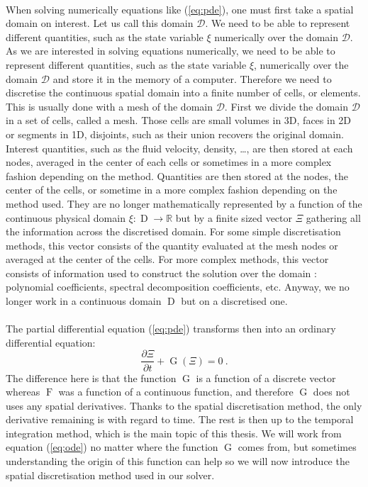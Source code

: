     \paragraph{}
    When solving numerically equations like (\ref{eq:pde}), one must first take a spatial domain on interest.
    Let us call this domain $\mathcal{D}$.
    We need to be able to represent different quantities, such as the state variable $\xi$ numerically over the domain $\mathcal{D}$.
    As we are interested in solving equations numerically, we need to be able to represent different quantities, such as the state variable $\xi$, numerically over the domain $\mathcal{D}$ and store it in the memory of a computer.
    Therefore we need to discretise the continuous spatial domain into a finite number of cells, or elements.
    This is usually done with a mesh of the domain $\mathcal{D}$.
    First we divide the domain $\mathcal{D}$ in a set of cells, called a mesh.
    Those cells are small volumes in 3D, faces in 2D or segments in 1D, disjoints, such as their union recovers the original domain.
    Interest quantities, such as the fluid velocity, density, \dots, are then stored at each nodes, averaged in the center of each cells or sometimes in a more complex fashion depending on the method.
    Quantities are then stored at the nodes, the center of the cells, or sometime in a more complex fashion depending on the method used.
    They are no longer mathematically represented by a function of the continuous physical domain $\xi : \operatorname{D} \rightarrow \mathbb{R}$ but by a finite sized vector $\Xi$ gathering all the information across the discretised domain.
    For some simple discretisation methods, this vector consists of the quantity evaluated at the mesh nodes or averaged at the center of the cells.
    For more complex methods, this vector consists of information used to construct the solution over the domain : polynomial coefficients, spectral decomposition coefficients, etc.
    Anyway, we no longer work in a continuous domain $\operatorname{D}$ but on a discretised one.

    \paragraph{}
    The partial differential equation (\ref{eq:pde}) transforms then into an ordinary differential equation:
    \begin{equation}\label{eq:ode}
      \frac{\partial \Xi}{\partial t} + \operatorname{G}\left(\Xi\right) = 0 \ .
    \end{equation}
    The difference here is that the function $\operatorname{G}$ is a function of a discrete vector whereas $\operatorname{F}$ was a function of a continuous function, and therefore $\operatorname{G}$ does not uses any spatial derivatives.
    Thanks to the spatial discretisation method, the only derivative remaining is with regard to time.
    The rest is then up to the temporal integration method, which is the main topic of this thesis.
    We will work from equation (\ref{eq:ode}) no matter where the function $\operatorname{G}$ comes from, but sometimes understanding the origin of this function can help so we will now introduce the spatial discretisation method used in our solver.


